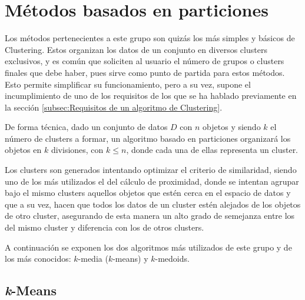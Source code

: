 \documentclass[3p,twocolumn]{elsarticle}
\begin{document}


\section{Métodos basados en particiones} \label{sec:Métodos basados en particiones}

Los métodos pertenecientes a este grupo son quizás los más simples y básicos de Clustering. Estos organizan los datos de un conjunto en diversos clusters exclusivos, y es común que soliciten al usuario el número de grupos o clusters finales que debe haber, pues sirve como punto de partida para estos métodos. Esto permite simplificar su funcionamiento, pero a su vez, supone el incumplimiento de uno de los requisitos de los que se ha hablado previamente en la sección \ref{subsec:Requisitos de un algoritmo de Clustering}.

De forma técnica, dado un conjunto de datos $D$ con $n$ objetos y siendo $k$ el número de clusters a formar, un algoritmo basado en particiones organizará los objetos en $k$ divisiones, con $k \leq n$, donde cada una de ellas representa un cluster. 

Los clusters son generados intentando optimizar el criterio de similaridad, siendo uno de los más utilizados el del cálculo de proximidad, donde se intentan agrupar bajo el mismo clusters aquellos objetos que estén cerca en el espacio de datos y que a su vez, hacen que todos los datos de un cluster estén alejados de los objetos de otro cluster, asegurando de esta manera un alto grado de semejanza entre los del mismo cluster y diferencia con los de otros clusters.

A continuación se exponen los dos algoritmos más utilizados de este grupo y de los más conocidos: $k$-media ($k$-means) y $k$-medoids.




\subsection{\textbf{\textit{k}-Means}} \label{subsec:k-Media}
\end{document}
